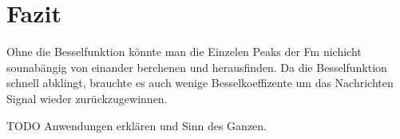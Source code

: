 %
%
%
\section{Fazit
\label{fm:section:fazit}}
Ohne die Besselfunktion könnte man die Einzelen Peaks der Fm nichicht sounabängig von einander berchenen und herausfinden.
Da die Besselfunktion schnell abklingt, brauchte es auch wenige Besselkoeffizente um das Nachrichten Signal wieder zurückzugewinnen.

TODO  Anwendungen erklären und Sinn des Ganzen.


